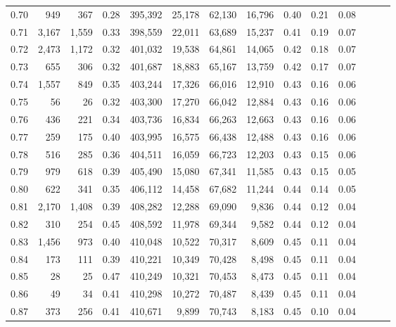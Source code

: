 \begin{tabular}{rrrrrrrrrrrrrr}
0.70 &     949 &    367 &  0.28 &  395,392 &   25,178 &  62,130 &  16,796 &  0.40 &  0.21 &      0.08 \\
0.71 &   3,167 &  1,559 &  0.33 &  398,559 &   22,011 &  63,689 &  15,237 &  0.41 &  0.19 &      0.07 \\
0.72 &   2,473 &  1,172 &  0.32 &  401,032 &   19,538 &  64,861 &  14,065 &  0.42 &  0.18 &      0.07 \\
0.73 &     655 &    306 &  0.32 &  401,687 &   18,883 &  65,167 &  13,759 &  0.42 &  0.17 &      0.07 \\
0.74 &   1,557 &    849 &  0.35 &  403,244 &   17,326 &  66,016 &  12,910 &  0.43 &  0.16 &      0.06 \\
0.75 &      56 &     26 &  0.32 &  403,300 &   17,270 &  66,042 &  12,884 &  0.43 &  0.16 &      0.06 \\
0.76 &     436 &    221 &  0.34 &  403,736 &   16,834 &  66,263 &  12,663 &  0.43 &  0.16 &      0.06 \\
0.77 &     259 &    175 &  0.40 &  403,995 &   16,575 &  66,438 &  12,488 &  0.43 &  0.16 &      0.06 \\
0.78 &     516 &    285 &  0.36 &  404,511 &   16,059 &  66,723 &  12,203 &  0.43 &  0.15 &      0.06 \\
0.79 &     979 &    618 &  0.39 &  405,490 &   15,080 &  67,341 &  11,585 &  0.43 &  0.15 &      0.05 \\
0.80 &     622 &    341 &  0.35 &  406,112 &   14,458 &  67,682 &  11,244 &  0.44 &  0.14 &      0.05 \\
0.81 &   2,170 &  1,408 &  0.39 &  408,282 &   12,288 &  69,090 &   9,836 &  0.44 &  0.12 &      0.04 \\
0.82 &     310 &    254 &  0.45 &  408,592 &   11,978 &  69,344 &   9,582 &  0.44 &  0.12 &      0.04 \\
0.83 &   1,456 &    973 &  0.40 &  410,048 &   10,522 &  70,317 &   8,609 &  0.45 &  0.11 &      0.04 \\
0.84 &     173 &    111 &  0.39 &  410,221 &   10,349 &  70,428 &   8,498 &  0.45 &  0.11 &      0.04 \\
0.85 &      28 &     25 &  0.47 &  410,249 &   10,321 &  70,453 &   8,473 &  0.45 &  0.11 &      0.04 \\
0.86 &      49 &     34 &  0.41 &  410,298 &   10,272 &  70,487 &   8,439 &  0.45 &  0.11 &      0.04 \\
0.87 &     373 &    256 &  0.41 &  410,671 &    9,899 &  70,743 &   8,183 &  0.45 &  0.10 &      0.04 \\

\end{tabular}
